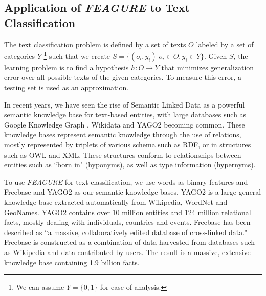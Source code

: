 \documentclass[twoside,11pt]{article}
\theoremstyle{definition}
\begin{document}
\subsection{Application of \emph{FEAGURE} to Text Classification} \label{text-feagure}

The text classification problem is defined by a set of texts $O$ labeled by a set of categories $Y$ \footnote{We can assume $Y=\{0,1\}$ for ease of analysis.}
such that we create $S=\{(o_i,y_i)|o_i\in O, y_i\in Y\}$. Given $S$, the learning problem is to find a hypothesis $h:O\rightarrow Y$ that minimizes generalization error over all possible texts of the given categories. To measure this error, a testing set is used as an approximation.

In recent years, we have seen the rise of Semantic Linked Data as a powerful semantic knowledge base for text-based entities, with large databases such as Google Knowledge Graph \cite{pelikanova2014google}, Wikidata \cite{vrandevcic2014wikidata} and YAGO2  becoming common. 
These knowledge bases represent semantic knowledge through the use of relations, mostly represented by triplets of various schema such as RDF, or in structures such as OWL and XML. These structures conform to relationships between entities such as ``born in" (hyponyms), as well as type information (hypernyms).

To use \emph{FEAGURE} for text classification, we use words as binary features and Freebase and YAGO2 as our semantic knowledge bases.
YAGO2 is a large general knowledge base extracted automatically from Wikipedia, WordNet and GeoNames.
YAGO2 contains over 10 million entities and 124 million relational facts, mostly dealing with individuals, countries and events.
Freebase \cite{bollacker2008freebase} has been described as ``a massive, collaboratively edited database of cross-linked data." Freebase is constructed as a combination of data harvested from databases such as Wikipedia and data contributed by users. The result is a massive, extensive knowledge base containing 1.9 billion facts. 
\end{document}
